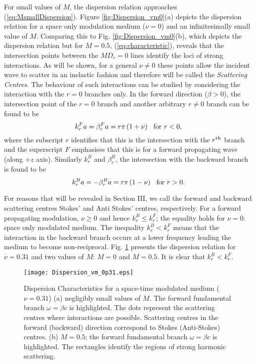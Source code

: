 \documentclass[journal]{IEEEtran}
\begin{document}
For small values of $M$, the dispersion relation approaches (\ref{eq:MsmallDispersion}). Figure \ref{fig:Dispersion_vm0}(a) depicts the dispersion relation for a space only modulation medium ($\nu=0$) and an infinitesimally small value of $M$. Comparing this to Fig. \ref{fig:Dispersion_vm0}(b), which depicts the dispersion relation but for $M=0.5$, (\ref{eq:characteristic}), reveals that the intersection points between the $MD_r=0$ lines identify the loci of strong interactions. As will be shown, for a general $\nu\neq 0$ these points allow the incident wave to scatter in an inelastic fashion and therefore will be called the \emph{Scattering Centres}. The behaviour of such interactions can be studied by considering the interaction with the $r=0$ branches only. In the forward direction ($\beta>0$), the intersection point of the $r=0$ branch and another arbitrary $r\neq 0$ branch can be found to be
\begin{equation}
\label{eq:ffreq}
k_{r}^Fa=\beta_{r}^Fa=r\pi\left(1+\nu\right)~~\textnormal{for}~r<0,
\end{equation}
where the subscript $r$ identifies that this is the intersection with the $r^\textnormal{th}$ branch and the superscript $F$ emphasises that this is for a forward propagating wave (along $+z$ axis). Similarly $k_{r}^B$ and $\beta_{r}^B$, the intersection with the backward branch is found to be
\begin{equation}
\label{bfreq}
k_{r}^Ba=-\beta_{r}^Ba=r\pi\left(1-\nu\right)~~\textnormal{for}~r>0.
\end{equation}

For reasons that will be revealed in Section III, we call the forward and backward scattering centres Stokes' and Anti Stokes' centres, respectively. For a forward propagating modulation, $\nu\geq 0$ and hence $k_{r}^B\leq k_{r}^F$; the equality holds for $\nu=0$: space only modulated medium. The inequality $k_{r}^B< k_{r}^F$ means that the interaction in the backward branch occurs at a lower frequency leading the medium to become non-reciprocal. Fig. \ref{fig:Dispersion_vm0p31} presents the dispersion relation for $\nu=0.31$ and two values of $M$:  $M=0$ and $M=0.5$. It is clear that $k_{r}^B< k_{r}^F$.
\begin{figure}
\centering
\texttt{[image: Dispersion\_vm\_0p31.eps]}
\caption{Dispersion Characteristics for a space-time modulated medium ($\nu=0.31$) (a) negligibly small values of $M$. The forward fundamental branch $\omega=\beta c$ is highlighted. The dots represent the scattering centres where interactions are possible. Scattering centres in the forward (backward) direction correspond to Stokes (Anti-Stokes) centres. (b)  $M=0.5$; the forward fundamental branch $\omega=\beta c$ is highlighted. The rectangles identify the regions of strong harmonic scattering.}
\label{fig:Dispersion_vm0p31}
\end{figure}
\end{document}
